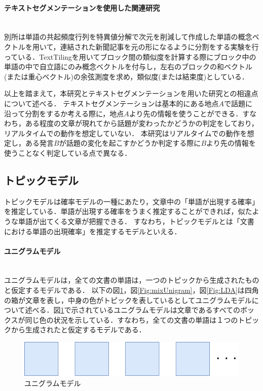 \paragraph{テキストセグメンテーションを使用した関連研究}\ \\
別所\cite{textSegmentation1}は単語の共起頻度行列を特異値分解で次元を削減して作成した単語の概念ベクトルを用いて，連結された新聞記事を元の形になるように分割をする実験を行っている．TextTilingを用いてブロック間の類似度を計算する際にブロック中の単語の中で自立語にのみ概念ベクトルを付与し，左右のブロックの和ベクトル(または重心ベクトル)の余弦測度を求め，類似度(または結束度)としている．

以上を踏まえて，本研究とテキストセグメンテーションを用いた研究との相違点について述べる．
テキストセグメンテーションは基本的にある地点$A$で話題に沿って分割をするか考える際に，地点$A$より先の情報を使うことができる．すなわち，ある程度の文章が現れてから話題が変わったかどうかの判定をしており，リアルタイムでの動作を想定していない．
本研究はリアルタイムでの動作を想定し，ある発言$B$が話題の変化を起こすかどうか判定する際に$B$より先の情報を使うことなく判定している点で異なる．
%
\subsection{トピックモデル}
トピックモデル\cite{topicModel}は確率モデルの一種にあたり，文章中の「単語が出現する確率」を推定している．単語が出現する確率をうまく推定することができれば，似たような単語が出てくる文章が把握できる．
すなわち，トピックモデルとは「文書における単語の出現確率」を推定するモデルといえる．
\paragraph{ユニグラムモデル}\ \\
ユニグラムモデルは，全ての文書の単語は，一つのトピックから生成されたものと仮定するモデルである．
以下の図\ref{Fig:unigram}，図\ref{Fig:mixUnigram}，図\ref{Fig:LDA}は四角の箱が文章を表し，中身の色がトピックを表しているとしてユニグラムモデルについて述べる．図\ref{Fig:unigram}で示されているユニグラムモデルは文章であるすべてのボックスが同じ色の状況を示している．すなわち，全ての文書の単語は１つのトピックから生成されたと仮定するモデルである．
\begin{figure}[htbp]
 \begin{center}
  \includegraphics[width=\textwidth]{../images/2.Related_Work/topicModel-unigram.png}
  \caption{ユニグラムモデル}
  \label{Fig:unigram}
  \vspace{-10pt}
 \end{center}
\end{figure}

